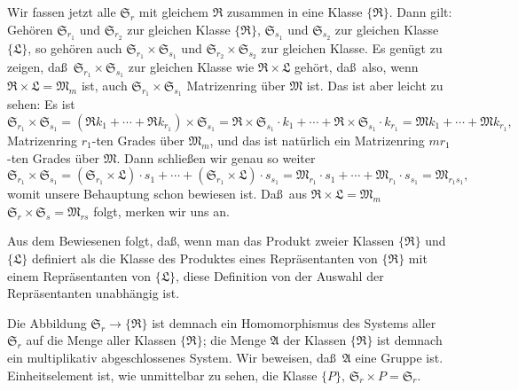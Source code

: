 \documentclass[12pt,a4paper]{article}
\theoremstyle{plain}
\theoremstyle{definition}
\theoremstyle{remark}
\begin{document}
Wir fassen jetzt alle $\mathfrak{S}_{r}$ mit gleichem $\mathfrak{R}$ zusammen in eine Klasse
$\{\mathfrak{R}\}$. Dann gilt: Geh\"oren $\mathfrak{S}_{r_{1}}$ und $\mathfrak{S}_{r_{2}}$ zur gleichen Klasse
$\{\mathfrak{R}\}$, $\mathfrak{S}_{s_{1}}$ und $\mathfrak{S}_{s_{2}}$ zur gleichen Klasse $\{\mathfrak{L}\}$, so geh\"oren
auch $\mathfrak{S}_{r_{1}} \times \mathfrak{S}_{s_{1}}$ und $\mathfrak{S}_{r_{2}} \times \mathfrak{S}_{s_{2}}$ zur gleichen Klasse. Es gen\"ugt zu
zeigen, da\ss\ $\mathfrak{S}_{r_{1}} \times \mathfrak{S}_{s_{1}}$ zur gleichen Klasse wie $\mathfrak{R} \times \mathfrak{L}$ geh\"ort,
da\ss\ also, wenn $\mathfrak{R} \times \mathfrak{L} = \mathfrak{M}_{m}$ ist, auch $\mathfrak{S}_{r_{1}} \times \mathfrak{S}_{s_{1}}$
Matrizenring \"uber $\mathfrak{M}$ ist. Das ist aber leicht zu sehen: Es ist
\[
\mathfrak{S}_{r_{1}} \times \mathfrak{S}_{s_{1}} = (\mathfrak{R}k_{1} + \cdots + \mathfrak{R}k_{r_{1}}) \times \mathfrak{S}_{s_{1}}
= \mathfrak{R} \times \mathfrak{S}_{s_{1}} \cdot k_{1} + \cdots + \mathfrak{R} \times \mathfrak{S}_{s_{1}} \cdot k_{r_{1}}
= \mathfrak{M}k_{1} + \cdots + \mathfrak{M}k_{r_{1}},
\]
Matrizenring $r_{1}$-ten Grades \"uber $\mathfrak{M}_{m}$, und das ist nat\"urlich ein
Matrizenring $mr_{1}$-ten Grades \"uber $\mathfrak{M}$. Dann schlie\ss en wir genau so weiter
\[
\mathfrak{S}_{r_{1}} \times \mathfrak{S}_{s_{1}}
= (\mathfrak{S}_{r_{1}} \times \mathfrak{L}) \cdot s_{1} + \cdots + (\mathfrak{S}_{r_{1}} \times \mathfrak{L}) \cdot s_{s_{1}}
= \mathfrak{M}_{r_{1}} \cdot s_{1} + \cdots + \mathfrak{M}_{r_{1}} \cdot s_{s_{1}}
= \mathfrak{M}_{r_{1}s_{1}},
\]
womit unsere Behauptung schon bewiesen ist. Da\ss\ aus $\mathfrak{R} \times \mathfrak{L} = \mathfrak{M}_{m}$
$\mathfrak{S}_{r} \times \mathfrak{S}_{s} = \mathfrak{M}_{rs}$ folgt, merken wir uns an.

Aus dem Bewiesenen folgt, da\ss, wenn man das Produkt zweier Klassen
$\{\mathfrak{R}\}$ und $\{\mathfrak{L}\}$ definiert als die Klasse des Produktes eines Repr\"asentanten
von $\{\mathfrak{R}\}$ mit einem Repr\"asentanten von $\{\mathfrak{L}\}$, diese Definition von der Auswahl
der Repr\"asentanten unabh\"angig ist.

Die Abbildung $\mathfrak{S}_{r} \to \{\mathfrak{R}\}$ ist demnach ein Homomorphismus des Systems
aller $\mathfrak{S}_{r}$ auf die Menge aller Klassen $\{\mathfrak{R}\}$; die Menge $\mathfrak{A}$ der Klassen
$\{\mathfrak{R}\}$ ist demnach ein multiplikativ abgeschlossenes System. Wir beweisen,
da\ss\ $\mathfrak{A}$ eine Gruppe ist. Einheitselement ist, wie unmittelbar zu sehen, die
Klasse $\{P\}$, $\mathfrak{S}_{r} \times P = \mathfrak{S}_{r}$.
\end{document}
